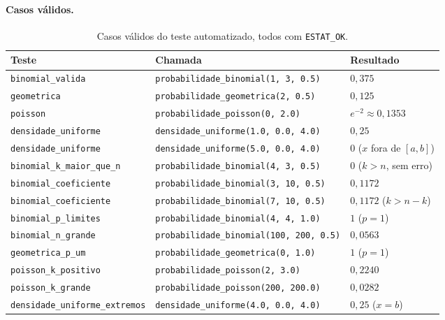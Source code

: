 \documentclass[12pt,a4paper]{article}
\newcommand{\cod}[1]{\texttt{#1}}
\begin{document}
\paragraph{Casos válidos.}
\begin{table}[h]
\centering
\footnotesize
\begin{tabular}{@{}lll@{}}
\toprule
Teste & Chamada & Resultado \\
\midrule
\scriptsize\cod{binomial\_valida}           & \cod{probabilidade\_binomial(1, 3, 0.5)}  & $0{,}375$ \\
\scriptsize\cod{geometrica}                 & \cod{probabilidade\_geometrica(2, 0.5)}   & $0{,}125$ \\
\scriptsize\cod{poisson}                    & \cod{probabilidade\_poisson(0, 2.0)}      & $e^{-2} \approx 0{,}1353$ \\
\scriptsize\cod{densidade\_uniforme}        & \cod{densidade\_uniforme(1.0, 0.0, 4.0)}  & $0{,}25$ \\
\scriptsize\cod{densidade\_uniforme}        & \cod{densidade\_uniforme(5.0, 0.0, 4.0)}  & $0$ ($x$ fora de $[a,b]$) \\
\scriptsize\cod{binomial\_k\_maior\_que\_n} & \cod{probabilidade\_binomial(4, 3, 0.5)}  & $0$ ($k > n$, sem erro) \\
\scriptsize\cod{binomial\_coeficiente}      & \cod{probabilidade\_binomial(3, 10, 0.5)} & $0{,}1172$ \\
\scriptsize\cod{binomial\_coeficiente}      & \cod{probabilidade\_binomial(7, 10, 0.5)} & $0{,}1172$ ($k > n-k$) \\
\scriptsize\cod{binomial\_p\_limites}       & \cod{probabilidade\_binomial(4, 4, 1.0)}  & $1$ ($p = 1$) \\
\scriptsize\cod{binomial\_n\_grande}        & \cod{probabilidade\_binomial(100, 200, 0.5)} & $0{,}0563$ \\
\scriptsize\cod{geometrica\_p\_um}          & \cod{probabilidade\_geometrica(0, 1.0)}   & $1$ ($p = 1$) \\
\scriptsize\cod{poisson\_k\_positivo}       & \cod{probabilidade\_poisson(2, 3.0)}      & $0{,}2240$ \\
\scriptsize\cod{poisson\_k\_grande}         & \cod{probabilidade\_poisson(200, 200.0)}  & $0{,}0282$ \\
\scriptsize\cod{densidade\_uniforme\_extremos} & \cod{densidade\_uniforme(4.0, 0.0, 4.0)} & $0{,}25$ ($x = b$) \\
\bottomrule
\end{tabular}
\caption{Casos válidos do teste automatizado, todos com \cod{ESTAT\_OK}.}
\end{table}
\end{document}
